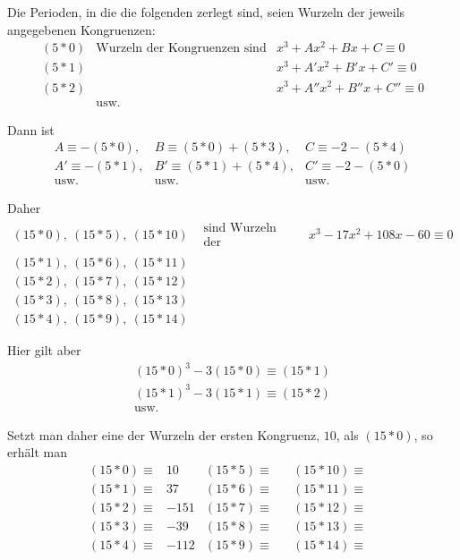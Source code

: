 Die Perioden, in die die folgenden zerlegt sind, seien Wurzeln der jeweils angegebenen Kongruenzen:
\[
\begin{array}{rll}
(5\ast0)&\text{Wurzeln der Kongruenzen sind}&x^3+Ax^2+Bx+C\equiv0\\
(5\ast1)&&x^3+A'x^2+B'x+C'\equiv0\\
(5\ast2)&&x^3+A''x^2+B''x+C''\equiv0\\
&\text{usw.}
\end{array}
\]

Dann ist
\[
\begin{array}{lll}
A\equiv-(5\ast0),&B\equiv(5\ast0)+(5\ast3),&C\equiv-2-(5\ast4)\\
A'\equiv-(5\ast1),&B'\equiv(5\ast1)+(5\ast4),&C'\equiv-2-(5\ast0)\\
\text{usw.}&\text{usw.}&\text{usw.}
\end{array}
\]

\begingroup\setlength{\arraycolsep}{4pt}Daher
\[
\begin{array}{lll}
(15\ast0),\ (15\ast5),\ (15\ast10)&\begin{gathered}\text{sind Wurzeln}\\\text{der Kongruenzen}\end{gathered}&x^3-17x^2+108x-60\equiv0\\
(15\ast1),\ (15\ast6),\ (15\ast11)&&\\
(15\ast2),\ (15\ast7),\ (15\ast12)&&\\
(15\ast3),\ (15\ast8),\ (15\ast13)&&\\
(15\ast4),\ (15\ast9),\ (15\ast14)&&
\end{array}
\]\endgroup

Hier gilt aber
\[
\begin{gathered}
(15\ast0)^3-3(15\ast0)\equiv(15\ast1)\\
(15\ast1)^3-3(15\ast1)\equiv(15\ast2)\\
\text{usw.}
\end{gathered}
\]

Setzt man daher eine der Wurzeln der ersten Kongruenz, $10$, als $(15\ast0)$, so erhält man
\[
\begin{array}{rlrlrl}
(15\ast0)\equiv&10&(15\ast5)\equiv&& (15\ast10)\equiv&\\
(15\ast1)\equiv&37&(15\ast6)\equiv&& (15\ast11)\equiv&\\
(15\ast2)\equiv&-151&(15\ast7)\equiv&& (15\ast12)\equiv&\\
(15\ast3)\equiv&-39&(15\ast8)\equiv&& (15\ast13)\equiv&\\
(15\ast4)\equiv&-112&(15\ast9)\equiv&& (15\ast14)\equiv&
\end{array}
\]

